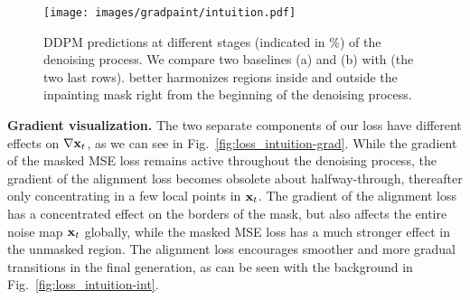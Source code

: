  

\begin{figure}[htbp]
  \centering
    \texttt{[image: images/gradpaint/intuition.pdf]}
    \caption{DDPM predictions at different stages (indicated in $\%$) of the denoising process. We compare two baselines (a) and (b) with \acro{} (the two last rows). \acro{} better harmonizes regions inside and outside the inpainting mask right from the beginning of the denoising process.}
    \label{fig:intuition}
\end{figure}

\noindent \textbf{Gradient visualization.} The two separate components of our loss have different effects on $\nabla{\mathbf{x}_t}$, as we can see in Fig.~\ref{fig:loss_intuition-grad}.  While the gradient of the masked MSE loss remains active throughout the denoising process, the gradient of the alignment loss becomes obsolete about halfway-through, thereafter only concentrating in a few local points in $\mathbf{x}_t$. The gradient of the alignment loss has a concentrated effect on the borders of the mask, but also affects the entire noise map $\mathbf{x}_t$ globally, while the masked MSE loss has a much stronger effect in the unmasked region. The alignment loss encourages smoother and more gradual transitions in the final generation, as can be seen with the background in Fig.~\ref{fig:loss_intuition-int}. 




